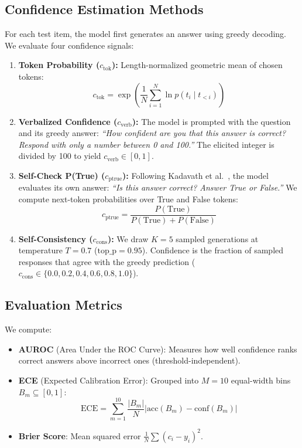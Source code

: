 \documentclass[10pt,twocolumn]{article}
\begin{document}
\subsection{Confidence Estimation Methods}
For each test item, the model first generates an answer using greedy decoding. We evaluate four confidence signals:
\begin{enumerate}
    \item \textbf{Token Probability ($c_{\text{tok}}$):} Length-normalized geometric mean of chosen tokens:
    $$c_{\text{tok}} = \exp\left( \frac{1}{N}\sum_{i=1}^N \ln p(t_i \mid t_{<i}) \right)$$
    \item \textbf{Verbalized Confidence ($c_{\text{verb}}$):} The model is prompted with the question and its greedy answer: \textit{``How confident are you that this answer is correct? Respond with only a number between 0 and 100.''} The elicited integer is divided by 100 to yield $c_{\text{verb}} \in [0, 1]$.
    \item \textbf{Self-Check P(True) ($c_{\text{ptrue}}$):} Following Kadavath et al.~\cite{kadavath2022language}, the model evaluates its own answer: \textit{``Is this answer correct? Answer True or False.''} We compute next-token probabilities over True and False tokens:
    $$c_{\text{ptrue}} = \frac{P(\text{True})}{P(\text{True}) + P(\text{False})}$$
    \item \textbf{Self-Consistency ($c_{\text{cons}}$):} We draw $K=5$ sampled generations at temperature $T=0.7$ ($\text{top\_p}=0.95$). Confidence is the fraction of sampled responses that agree with the greedy prediction ($c_{\text{cons}} \in \{0.0, 0.2, 0.4, 0.6, 0.8, 1.0\}$).
\end{enumerate}

\subsection{Evaluation Metrics}
We compute:
\begin{itemize}
    \item \textbf{AUROC} (Area Under the ROC Curve): Measures how well confidence ranks correct answers above incorrect ones (threshold-independent).
    \item \textbf{ECE} (Expected Calibration Error): Grouped into $M=10$ equal-width bins $B_m \subseteq [0, 1]$:
    $$\text{ECE} = \sum_{m=1}^{10} \frac{|B_m|}{N} \left| \text{acc}(B_m) - \text{conf}(B_m) \right|$$
    \item \textbf{Brier Score}: Mean squared error $\frac{1}{N}\sum (c_i - y_i)^2$.
\end{itemize}
\end{document}
